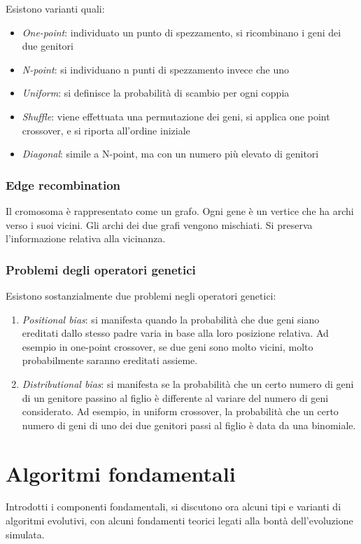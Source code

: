 \documentclass[a4paper]{article}
\begin{document}
Esistono varianti quali:
\begin{itemize}
    \item \emph{One-point}: individuato un punto di spezzamento, si ricombinano i geni dei due genitori
    \item \emph{N-point}: si individuano n punti di spezzamento invece che uno
    \item \emph{Uniform}: si definisce la probabilità di scambio per ogni coppia
    \item \emph{Shuffle}: viene effettuata una permutazione dei geni, si applica one point crossover, 
    e si riporta all'ordine iniziale
    \item \emph{Diagonal}: simile a N-point, ma con un numero più elevato di genitori
\end{itemize}

\subsubsection{Edge recombination}
Il cromosoma è rappresentato come un grafo.
Ogni gene è un vertice che ha archi verso i suoi vicini. Gli archi dei due
grafi vengono mischiati. Si preserva l’informazione relativa alla vicinanza.

\subsubsection{Problemi degli operatori genetici}
Esistono sostanzialmente due problemi negli operatori genetici:
\begin{enumerate}
    \item \emph{Positional bias}: si manifesta quando la probabilità che due geni
    siano ereditati dallo stesso padre varia in base alla loro posizione relativa. Ad esempio
    in one-point crossover, se due geni sono molto vicini, molto probabilmente saranno ereditati
    assieme.
    \item \emph{Distributional bias}: si manifesta se la probabilità che un certo numero di geni 
    di un genitore passino al figlio è differente al variare del numero di geni considerato.
    Ad esempio, in uniform crossover, la probabilità che un certo numero di geni di uno dei due genitori
    passi al figlio è data da una binomiale. 
\end{enumerate}

\newpage
\section{Algoritmi fondamentali}
Introdotti i componenti fondamentali, si discutono ora alcuni tipi e varianti di algoritmi
evolutivi, con alcuni fondamenti teorici legati alla bontà dell'evoluzione simulata.
\end{document}
